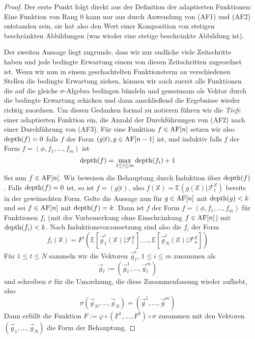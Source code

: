 \begin{proof}
Der erste Punkt folgt direkt aus der Definition der adaptierten Funktionen: Eine Funktion von Rang 0 kann nur aus durch Anwendung von (AF1) und (AF2) entstanden sein, sie hat also den Wert einer Komposition von stetigen beschränkten Abbildungen (was wieder eine stetige beschränkte Abbildung ist). 

Der zweiten Aussage liegt zugrunde, dass wir nur endliche viele Zeitschritte haben und jede bedingte Erwartung einem von diesen Zeitschritten zugeordnet ist. Wenn wir nun in einem geschachtelten Funktionsterm an verschiedenen Stellen die bedingte Erwartung ziehen, können wir auch zuerst alle Funktionen die auf die gleiche $\sigma$-Algebra bedingen bündeln und gemeinsam als Vektor durch die bedingte Erwartung schicken und dann anschließend die Ergebnisse wieder richtig zuordnen. Um diesen Gedanken formal zu notieren führen wir die \emph{Tiefe} einer adaptierten Funktion ein, die Anzahl der Durchführungen von (AF2) nach einer Durchführung von (AF3). Für eine Funktion $f \in \operatorname{AF}[n]$ setzen wir also $\operatorname{depth}(f)=0$ falls $f$ der Form $(g \vert t), g \in \operatorname{AF}[n-1]$ ist, und induktiv falls $f$ der Form $f=(\phi, f_1,...,f_m)$ ist
$$\operatorname{depth}(f) = \max_{1\leq i \leq m} \operatorname{depth}(f_i) + 1$$
Sei nun $f \in \operatorname{AF}[n]$. Wir beweisen die Behauptung durch Induktion über $\operatorname{depth}(f)$. Falls $\operatorname{depth}(f)=0$ ist, so ist $f = (g \vert t)$, also $f(\mathbb{X}) = \mathbb{E}(g(\mathbb{X})\vert \mathcal{F}_t^\mathbb{X})$ bereits in der gewünschten Form. Gelte die Aussage nun für $g \in \operatorname{AF}[n]$ mit $\operatorname{depth}(g) < k$ und sei $f\in\operatorname{AF}[n]$ mit $\operatorname{depth}(f)=k$. Dann ist $f$ der Form $f=(\phi, f_1,...,f_m)$ für Funktionen $f_i$ (mit der Vorbemerkung ohne Einschränkung $f \in \operatorname{AF}[n]$) mit $\operatorname{depth}(f_i)<k$. Nach Induktionsvoraussetzung sind also die $f_i$ der Form
$$f_i(\mathbb{X}) = F^i(\mathbb{E}[\vec{g}_1^i(\mathbb{X}) \vert \mathcal{F}_1^\mathbb{X}],...,\mathbb{E}[\vec{g}_N^i(\mathbb{X}) \vert \mathcal{F}_n^\mathbb{X}])$$
Für $1\leq t \leq N$ sammeln wir die Vektoren $\vec{g}_t^i$, $1 \leq i \leq m$ zusammen als
$$\vec{g}_t:=(\vec{g}_t^1,...,\vec{g}_t^m)$$
und schreiben $\sigma$ für die Umordnung, die diese Zusammenfassung wieder aufhebt, also
$$\sigma(\vec{g}_N,...,\vec{g}_N) = (\vec{g}^1,...,\vec{g}^m)$$
Dann erfüllt die Funktion $F := \varphi \circ (F^1,...,F^k) \circ \sigma$ zusammen mit den Vektoren $(\vec{g}_1,...,\vec{g}_N)$ die Form der Behauptung.
\end{proof}

